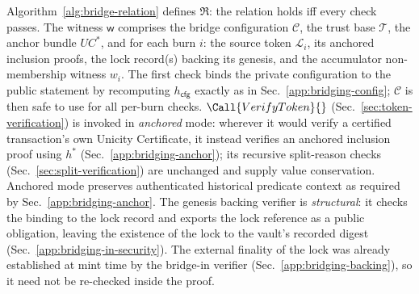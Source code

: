 Algorithm~\ref{alg:bridge-relation} defines $\mathfrak{R}$: the relation holds iff every check passes. The witness $\mathsf{w}$ comprises the bridge configuration $\mathcal{C}$, the trust base $\mathcal{T}$, the anchor bundle $UC^*$, and for each burn $i$: the source token $\mathcal{L}_i$, its anchored inclusion proofs, the lock record(s) backing its genesis, and the accumulator non-membership witness $w_i$. The first check binds the private configuration to the public statement by recomputing $h_\mathsf{cfg}$ exactly as in Sec.~\ref{app:bridging-config}; $\mathcal{C}$ is then safe to use for all per-burn checks. $\Call{VerifyToken}{}$ (Sec.~\ref{sec:token-verification}) is invoked in \emph{anchored} mode: wherever it would verify a certified transaction's own Unicity Certificate, it instead verifies an anchored inclusion proof using $h^*$ (Sec.~\ref{app:bridging-anchor}); its recursive split-reason checks (Sec.~\ref{sec:split-verification}) are unchanged and supply value conservation. Anchored mode preserves authenticated historical predicate context as required by Sec.~\ref{app:bridging-anchor}. The genesis backing verifier is \emph{structural}: it checks the binding to the lock record and exports the lock reference as a public obligation, leaving the existence of the lock to the vault's recorded digest (Sec.~\ref{app:bridging-in-security}). The external finality of the lock was already established at mint time by the bridge-in verifier (Sec.~\ref{app:bridging-backing}), so it need not be re-checked inside the proof.

